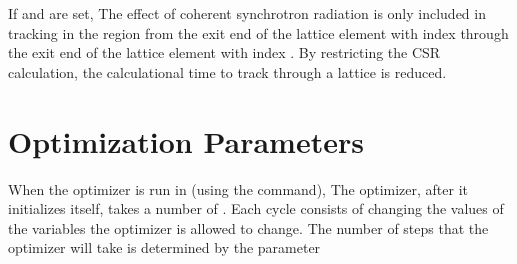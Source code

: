 {{{{{{{{{{{If  and  are set, The effect of
coherent synchrotron radiation is only included in tracking in the
region from the exit end of the lattice element with index
 through the exit end of the lattice element with index
. By restricting the CSR calculation,
the calculational time to track through a lattice is reduced.

\section{Optimization Parameters}
\label{s:opt.params}

When the optimizer is run in \tao (using the  command), The
optimizer, after it initializes itself, takes a number of
. Each cycle consists of changing the values of the
variables the optimizer is allowed to change. The number of steps that
the optimizer will take is determined by the parameter
\vn{global%
goes through \vn{global%
through one \vn{loop}. After going through through
\vn{global%
To immediately stop the optimizer the period key
\vn{``.''} may be pressed.

\section{Initializing Connected Universes}
\index{Initialization!Connected Universes}
\label{s:connected.uni}

}}}}}}}}}}}}}}
